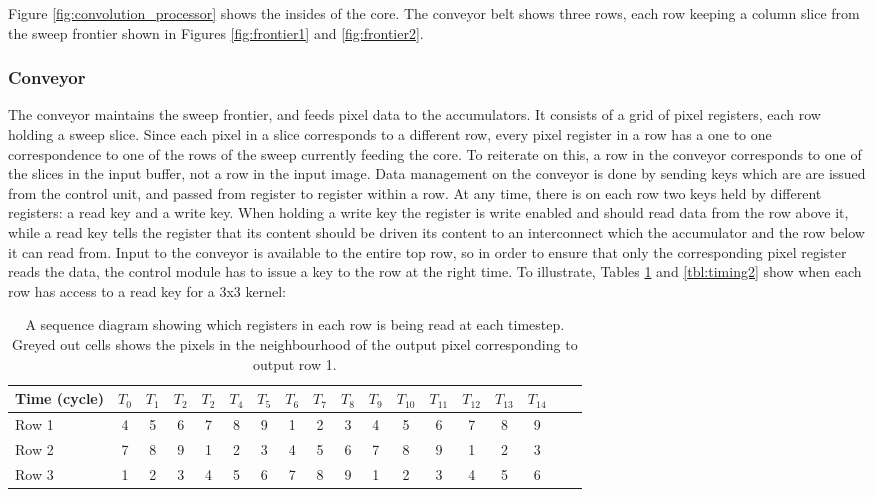 Figure \ref{fig:convolution_processor} shows the insides of the core. 
The conveyor belt shows three rows, each row keeping a column slice from the sweep frontier shown in Figures \ref{fig:frontier1} and \ref{fig:frontier2}.

\subsubsection{Conveyor}
The conveyor maintains the sweep frontier, and feeds pixel data to the accumulators.
It consists of a grid of pixel registers, each row holding a sweep slice.
Since each pixel in a slice corresponds to a different row, every pixel register in a row has a one to one correspondence to one of the rows of the sweep currently feeding the core.
To reiterate on this, a row in the conveyor corresponds to one of the slices in the input buffer, not a row in the input image.
Data management on the conveyor is done by sending keys which are are issued from the control unit, and passed from register to register within a row.
At any time, there is on each row two keys held by different registers: a read key and a write key.
When holding a write key the register is write enabled and should read data from the row above it, while a read key tells the register that its content should be driven its content to an interconnect which the accumulator and the row below it can read from.
Input to the conveyor is available to the entire top row, so in order to ensure that only the corresponding pixel register reads the data, the control module has to issue a key to the row at the right time.
To illustrate, Tables \ref{tbl:timing1} and \ref{tbl:timing2} show when each row has access to a read key for a 3x3 kernel:
\begin{table}[h]
    \begin{tabular}{l*{16}{c}r}
    Time (cycle)        & $T_{0}$ & $T_{1}$ & $T_{2}$ & $T_{2}$ & $T_{4}$  & $T_{5}$ & $T_{6}$ & $T_{7}$ & $T_{8}$ & $T_{9}$ & $T_{10}$ & $T_{11}$ & $T_{12}$ & $T_{13}$ & $T_{14}$\\
    \hline
    Row 1                   & 4 & 5 & 6 & 7 & 8 & 9 & \cellcolor{gray75} 1 & \cellcolor{gray75} 2 & \cellcolor{gray75} 3 & 4 & 5 & 6 & 7 & 8 & 9 & \\
    Row 2                   & 7 & 8 & 9 & \cellcolor{gray75} 1 & \cellcolor{gray75} 2 & \cellcolor{gray75} 3 & 4 & 5 & 6 & 7 & 8 & 9 & \cellcolor{gray75} 1 & \cellcolor{gray75} 2 & \cellcolor{gray75} 3 & \\
    Row 3                   & \cellcolor{gray75} 1 & \cellcolor{gray75} 2 & \cellcolor{gray75} 3 & 4 & 5 & 6 & 7 & 8 & 9 & \cellcolor{gray75} 1 & \cellcolor{gray75} 2 & \cellcolor{gray75} 3 & 4 & 5 & 6 & \\
    \end{tabular}
    \caption[Sequence diagram for write keys]{A sequence diagram showing which registers in each row is being read at each timestep. Greyed out cells shows the pixels in the neighbourhood of the output pixel corresponding to output row 1.}
    \label{tbl:timing1}
\end{table}
